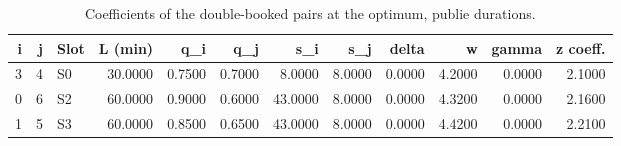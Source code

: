 \begin{table}[htbp]
\caption{Coefficients of the double-booked pairs at the optimum, publie durations.}
\label{tab:pairs-publie}
\begin{tabular}{rrlrrrrrrrrr}
\toprule
i & j & Slot & L (min) & q\_i & q\_j & s\_i & s\_j & delta & w & gamma & z coeff. \\
\midrule
3 & 4 & S0 & 30.0000 & 0.7500 & 0.7000 & 8.0000 & 8.0000 & 0.0000 & 4.2000 & 0.0000 & 2.1000 \\
0 & 6 & S2 & 60.0000 & 0.9000 & 0.6000 & 43.0000 & 8.0000 & 0.0000 & 4.3200 & 0.0000 & 2.1600 \\
1 & 5 & S3 & 60.0000 & 0.8500 & 0.6500 & 43.0000 & 8.0000 & 0.0000 & 4.4200 & 0.0000 & 2.2100 \\
\bottomrule
\end{tabular}
\end{table}

